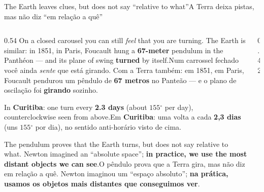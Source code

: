 \documentclass[aspectratio=169,11pt]{beamer}
\newcommand{\tr}[2]{\ifEN#2\else#1\fi}
\newcommand{\bnum}[1]{\textbf{\textcolor{mTeal}{#1}}}
\newcommand{\gr}{\ensuremath{{}^{\circ}}}
\begin{document}
\begin{frame}{\tr{A Terra deixa pistas, mas não diz ``em relação a quê''}{The Earth leaves clues, but does not say ``relative to what''}}
  \begin{columns}[T]
    \begin{column}{0.54\textwidth}
      \small
      \tr{Num carrossel fechado você ainda \emph{sente} que está girando. Com a Terra também:
      em 1851, em Paris, Foucault pendurou um pêndulo de \bnum{67 metros} no Panteão --- e o
      plano de oscilação foi \bnum{girando} sozinho.}{On a closed carousel you can still
      \emph{feel} that you are turning. The Earth is similar: in 1851, in Paris, Foucault hung
      a \bnum{67-meter} pendulum in the Panthéon --- and its plane of swing \bnum{turned} by
      itself.}
      \medskip

      \tr{Em \textbf{Curitiba}: uma volta a cada \bnum{2,3 dias} (uns $155\gr$ por dia), no
      sentido anti-horário visto de cima.}{In \textbf{Curitiba}: one turn every \bnum{2.3 days}
      (about $155\gr$ per day), counterclockwise seen from above.}
      \medskip

      \begin{cuidado}[title={\tr{Mas falta uma resposta}{But an answer is missing}}]
        \footnotesize\tr{O pêndulo prova que a Terra gira, mas não diz \alert{em relação a
        quê}. Newton imaginou um ``espaço absoluto''; \bnum{na prática, usamos os objetos mais
        distantes que conseguimos ver}.}{The pendulum proves that the Earth turns, but does not
        say \alert{relative to what}. Newton imagined an ``absolute space''; \bnum{in practice,
        we use the most distant objects we can see}.}
      \end{cuidado}
    \end{column}
    \begin{column}{0.42\textwidth}
      \centering
    \end{column}
  \end{columns}
\end{frame}
\end{document}
